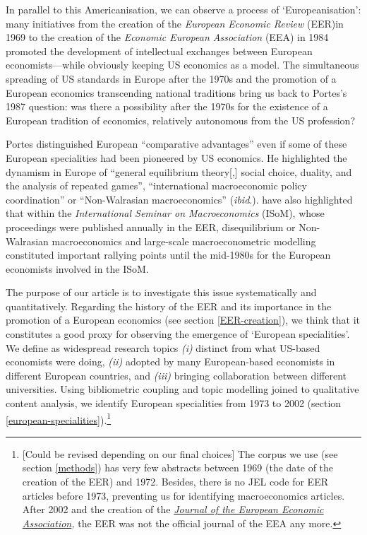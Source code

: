 \documentclass[]{elsarticle} %
\begin{document}
In parallel to this Americanisation, we can observe a process of
`Europeanisation': many initiatives from the creation of the
\emph{European Economic Review} (EER)in 1969 to the creation of the
\emph{Economic European Association} (EEA) in 1984 promoted the
development of intellectual exchanges between European
economists---while obviously keeping US economics as a model. The
simultaneous spreading of US standards in Europe after the 1970s and the
promotion of a European economics transcending national traditions bring
us back to Portes's 1987 question: was there a possibility after the
1970s for the existence of a European tradition of economics, relatively
autonomous from the US profession?

Portes distinguished European ``comparative advantages''
\citep[1332]{portes1987} even if some of these European specialities had
been pioneered by US economics. He highlighted the dynamism in Europe of
``general equilibrium theory{[},{]} social choice, duality, and the
analysis of repeated games'', ``international macroeconomic policy
coordination'' or ``Non-Walrasian macroeconomics'' (\emph{ibid}.).
\citep{goutsmedt2021} have also highlighted that within the
\emph{International Seminar on Macroeconomics} (ISoM), whose proceedings
were published annually in the EER, disequilibrium or Non-Walrasian
macroeconomics and large-scale macroeconometric modelling constituted
important rallying points until the mid-1980s for the European
economists involved in the ISoM.

The purpose of our article is to investigate this issue systematically
and quantitatively. Regarding the history of the EER and its importance
in the promotion of a European economics (see section
\ref{EER-creation}), we think that it constitutes a good proxy for
observing the emergence of `European specialities'. We define as
widespread research topics \emph{(i)} distinct from what US-based
economists were doing, \emph{(ii)} adopted by many European-based
economists in different European countries, and \emph{(iii)} bringing
collaboration between different universities. Using bibliometric
coupling and topic modelling joined to qualitative content analysis, we
identify European specialities from 1973 to 2002 (section
\ref{european-specialities}).\footnote{{[}Could be revised depending on
  our final choices{]} The corpus we use (see section \ref{methods}) has
  very few abstracts between 1969 (the date of the creation of the EER)
  and 1972. Besides, there is no JEL code for EER articles before 1973,
  preventing us for identifying macroeconomics articles. After 2002 and
  the creation of the \href{https://academic.oup.com/jeea}{\emph{Journal
  of the European Economic Association}}\emph{,} the EER was not the
  official journal of the EEA any more.}
\end{document}
